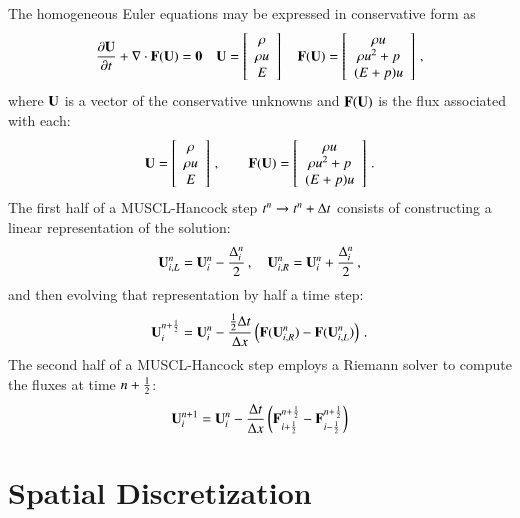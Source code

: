 \documentclass[preprint,12pt]{elsarticle}
\begin{document}
The homogeneous Euler equations may be expressed in conservative form as
\begin{equation}
\frac{\partial \mathbf{U}}{\partial t} + \nabla\cdot\mathbf{F}(\mathbf{U}) = \mathbf{0}\quad
\mathbf{U}=\left[\begin{array}{c}\rho\\\rho u\\E\end{array}\right]\quad
\mathbf{F}(\mathbf{U})=\left[\begin{array}{c}\rho u\\
  \rho u^2 + p\\
  (E+p)u\end{array}\right] \, ,
\end{equation}
where $\mathbf{U}$ is a vector of the conservative unknowns
and $\mathbf{F}(\mathbf{U})$ is the flux associated with each:
\begin{equation}
\mathbf{U}=\left[\begin{array}{c}\rho\\\rho u\\E\end{array}\right] \, ,\qquad
\mathbf{F}(\mathbf{U})=\left[\begin{array}{c}\rho u\\
  \rho u^2 + p\\
  (E+p)u\end{array}\right] \, .
\end{equation}
The first half of a MUSCL-Hancock step $t^n\rightarrow t^n+\Delta t$
consists of constructing a linear representation of the solution:
\begin{equation}
  \mathbf{U}_{i,L}^n = \mathbf{U}_i^n - \frac{\Delta_i^n}{2} \, ,
  \quad
  \mathbf{U}_{i,R}^n = \mathbf{U}_i^n + \frac{\Delta_i^n}{2} \, ,
\end{equation}
and then evolving that representation by half a time step:
\begin{equation}
  \mathbf{U}_i^{n+\frac{1}{2}} = \mathbf{U}_i^n - \frac{\frac{1}{2}\Delta t}{\Delta x}
  \left(\mathbf{F}(\mathbf{U}_{i,R}^n) - \mathbf{F}(\mathbf{U}_{i,L}^n)\right) \, .
\end{equation}
The second half of a MUSCL-Hancock step employs a Riemann solver
to compute the fluxes at time $n+\frac{1}{2}$:
\begin{equation}
  \mathbf{U}_i^{n+1} = \mathbf{U}_i^n - \frac{\Delta t}{\Delta x}
  \left(\mathbf{F}_{i+\frac{1}{2}}^{n+\frac{1}{2}} - \mathbf{F}_{i-\frac{1}{2}}^{n+\frac{1}{2}}\right)
\end{equation}

\section{Spatial Discretization}
\end{document}
